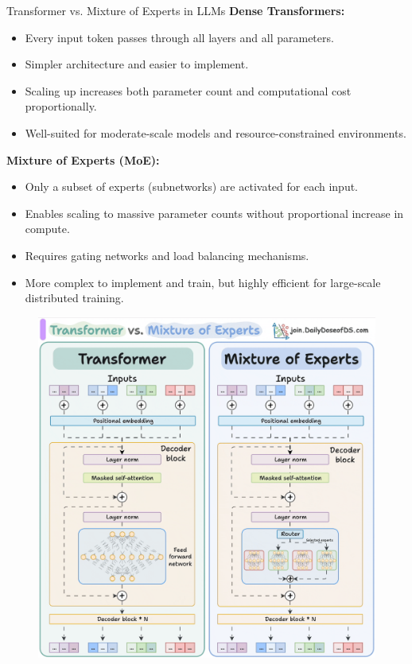 \begin{frame}[allowframebreaks]{Transformer vs. Mixture of Experts in LLMs}
    \textbf{Dense Transformers:}
    \begin{itemize}
        \item Every input token passes through all layers and all parameters.
        \item Simpler architecture and easier to implement.
        \item Scaling up increases both parameter count and computational cost proportionally.
        \item Well-suited for moderate-scale models and resource-constrained environments.
    \end{itemize}

\framebreak

    \textbf{Mixture of Experts (MoE):}
    \begin{itemize}
        \item Only a subset of experts (subnetworks) are activated for each input.
        \item Enables scaling to massive parameter counts without proportional increase in compute.
        \item Requires gating networks and load balancing mechanisms.
        \item More complex to implement and train, but highly efficient for large-scale distributed training.
    \end{itemize}

\framebreak

    \begin{figure}
        \centering
        \includegraphics[height=0.9\textheight,width=1\textwidth,keepaspectratio]{images/recent-advance/moe-transformer.png}
    \end{figure}


\end{frame}
